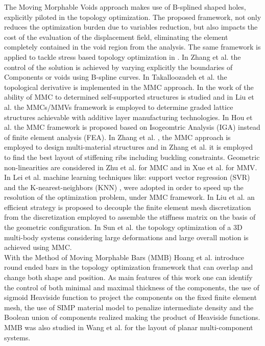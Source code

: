 The Moving Morphable Voids approach \cite{zhang2017explicit} makes use of B-splined shaped holes, explicitly piloted in the topology optimization. The proposed framework, not only reduces the optimization burden due to variables reduction, but also impacts the cost of the evaluation of the displacement field, eliminating the element completely contained in the void region from the analysis. The same framework is applied to tackle stress based topology optimization in \cite{zhang2018moving}.
In Zhang et al. \cite{zhang2017structuralo} the control of the solution is achieved by varying explicitly the boundaries of Components or voids using B-spline curves.  
In Takalloozadeh et al. \cite{takalloozadeh2017implementation} the topological derivative is implemented in the MMC approach.
 In the work of \cite{guo2017self} the ability of MMC to determined self-supported structures is studied and in Liu et al. \cite{liu2017additive} the MMCs/MMVs framework is employed to determine graded lattice structures achievable with additive layer manufacturing technologies. In Hou et al. \cite{hou2017explicit} the MMC framework is proposed based on Isogeomtric Analysis (IGA) instead of finite element analysis (FEA). In Zhang et al. \cite{zhang2018topology}, the MMC approach is employed to design multi-material structures and in Zhang et al. \cite{zhang2018movings} it is employed to find the best layout of stiffening ribs including buckling constraints. Geometric non-linearities are considered in Zhu et al. \cite{zhu2018structural} for MMC and in Xue et al. \cite{xue2019explicit} for MMV.
  In Lei et al. \cite{lei2019machine} machine learning techniques like:  support vector regression (SVR) \cite{smola2004tutorial} and the K-nearest-neighbors (KNN) \cite{altman1992introduction}, were adopted in order to speed up the resolution of the optimization problem, under MMC framework. In Liu et al. \cite{liu2018efficient} an efficient strategy is proposed to decouple the finite element mesh discretization from the discretization employed to assemble the stiffness matrix on the basis of the geometric configuration.
  In Sun et al. \cite{sun2018topology} the topology optimization of a 3D multi-body systems considering large deformations and large overall motion is achieved using MMC.\\  
With the Method of Moving Morphable Bars (MMB) Hoang et al. \cite{hoang2017topology} introduce round ended bars in the topology optimization framework that can overlap and change both shape and position. As main features of this work one can identify the control of both minimal and maximal thickness of the components, the use of sigmoid Heaviside function to project the components on the fixed finite element mesh, the use of SIMP material model to penalize intermediate density and the Boolean union of components realized making the product of Heaviside functions. MMB was also studied in Wang et al. \cite{wang2018explicit} for the layout of planar multi-component systems. \\
